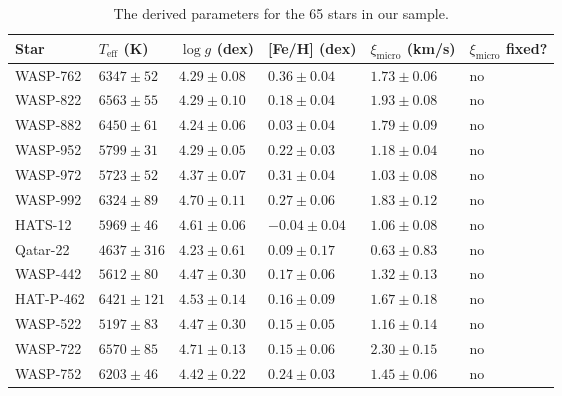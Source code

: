 \documentclass{aa}
\begin{document}
\begin{table*}[htb!]
    \caption{The derived parameters for the 65 stars in our sample.}
    \label{tab:results}
    \centering
    \begin{tabular}{llllll}
      \hline\hline
        Star      & $T_\mathrm{eff}$ (K) &  $\log g$ (dex)     &  [Fe/H] (dex)        &  $\xi_\mathrm{micro}$ (km/s) & $\xi_\mathrm{micro}$ fixed? \\
      \hline
      WASP-762    &    $6347 \pm 52 $    &  $4.29 \pm 0.08$    &  $ 0.36 \pm 0.04$    &  $1.73 \pm 0.06$             &   no  \\
      WASP-822    &    $6563 \pm 55 $    &  $4.29 \pm 0.10$    &  $ 0.18 \pm 0.04$    &  $1.93 \pm 0.08$             &   no  \\
      WASP-882    &    $6450 \pm 61 $    &  $4.24 \pm 0.06$    &  $ 0.03 \pm 0.04$    &  $1.79 \pm 0.09$             &   no  \\
      WASP-952    &    $5799 \pm 31 $    &  $4.29 \pm 0.05$    &  $ 0.22 \pm 0.03$    &  $1.18 \pm 0.04$             &   no  \\
      WASP-972    &    $5723 \pm 52 $    &  $4.37 \pm 0.07$    &  $ 0.31 \pm 0.04$    &  $1.03 \pm 0.08$             &   no  \\
      WASP-992    &    $6324 \pm 89 $    &  $4.70 \pm 0.11$    &  $ 0.27 \pm 0.06$    &  $1.83 \pm 0.12$             &   no  \\
      HATS-12     &    $5969 \pm 46 $    &  $4.61 \pm 0.06$    &  $-0.04 \pm 0.04$    &  $1.06 \pm 0.08$             &   no  \\
      Qatar-22    &    $4637 \pm 316$    &  $4.23 \pm 0.61$    &  $ 0.09 \pm 0.17$    &  $0.63 \pm 0.83$             &   no  \\
      WASP-442    &    $5612 \pm 80 $    &  $4.47 \pm 0.30$    &  $ 0.17 \pm 0.06$    &  $1.32 \pm 0.13$             &   no  \\
      HAT-P-462   &    $6421 \pm 121$    &  $4.53 \pm 0.14$    &  $ 0.16 \pm 0.09$    &  $1.67 \pm 0.18$             &   no  \\
      WASP-522    &    $5197 \pm 83 $    &  $4.47 \pm 0.30$    &  $ 0.15 \pm 0.05$    &  $1.16 \pm 0.14$             &   no  \\
      WASP-722    &    $6570 \pm 85 $    &  $4.71 \pm 0.13$    &  $ 0.15 \pm 0.06$    &  $2.30 \pm 0.15$             &   no  \\
      WASP-752    &    $6203 \pm 46 $    &  $4.42 \pm 0.22$    &  $ 0.24 \pm 0.03$    &  $1.45 \pm 0.06$             &   no  \\

\end{tabular}
\end{table*}
\end{document}
